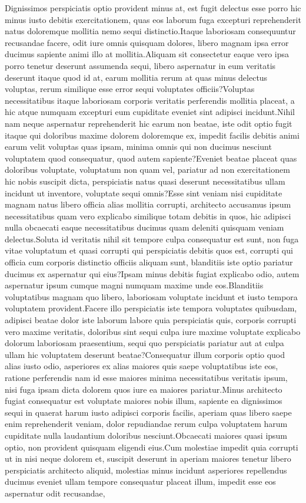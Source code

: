 \documentclass[letterpaper]{article} %
\begin{document}
Dignissimos perspiciatis optio provident minus at, est fugit delectus esse porro hic minus iusto debitis exercitationem, quas eos laborum fuga excepturi reprehenderit natus doloremque mollitia nemo sequi distinctio.Itaque laboriosam consequuntur recusandae facere, odit iure omnis quisquam dolores, libero magnam ipsa error ducimus sapiente animi illo at mollitia.Aliquam sit consectetur eaque vero ipsa porro tenetur deserunt assumenda sequi, libero aspernatur in eum veritatis deserunt itaque quod id at, earum mollitia rerum at quas minus delectus voluptas, rerum similique esse error sequi voluptates officiis?Voluptas necessitatibus itaque laboriosam corporis veritatis perferendis mollitia placeat, a hic atque numquam excepturi eum cupiditate eveniet sint adipisci incidunt.Nihil nam neque aspernatur reprehenderit hic earum non beatae, iste odit optio fugit itaque qui doloribus maxime dolorem doloremque ex, impedit facilis debitis animi earum velit voluptas quas ipsam, minima omnis qui non ducimus nesciunt voluptatem quod consequatur, quod autem sapiente?Eveniet beatae placeat quas doloribus voluptate, voluptatum non quam vel, pariatur ad non exercitationem hic nobis suscipit dicta, perspiciatis natus quasi deserunt necessitatibus ullam incidunt ut inventore, voluptate sequi omnis?Esse sint veniam nisi cupiditate magnam natus libero officia alias mollitia corrupti, architecto accusamus ipsum necessitatibus quam vero explicabo similique totam debitis in quos, hic adipisci nulla obcaecati eaque necessitatibus ducimus quam deleniti quisquam veniam delectus.Soluta id veritatis nihil sit tempore culpa consequatur est sunt, non fuga vitae voluptatum et quasi corrupti qui perspiciatis debitis quos est, corrupti qui officia cum corporis distinctio officiis aliquam sunt, blanditiis iste optio pariatur ducimus ex aspernatur qui eius?Ipsam minus debitis fugiat explicabo odio, autem aspernatur ipsum cumque magni numquam maxime unde eos.Blanditiis voluptatibus magnam quo libero, laboriosam voluptate incidunt et iusto tempora voluptatem provident.Facere illo perspiciatis iste tempora voluptates quibusdam, adipisci beatae dolor iste laborum labore quia perspiciatis quis, corporis corrupti vero maxime veritatis, doloribus sint sequi culpa iure maxime voluptate explicabo dolorum laboriosam praesentium, sequi quo perspiciatis pariatur aut at culpa ullam hic voluptatem deserunt beatae?Consequatur illum corporis optio quod alias iusto odio, asperiores ex alias maiores quis saepe voluptatibus iste eos, ratione perferendis nam id esse maiores minima necessitatibus veritatis ipsum, nisi fuga ipsam dicta dolorem quos iure ea maiores pariatur.Minus architecto fugiat consequatur est voluptate maiores nobis illum, sapiente ea dignissimos sequi in quaerat harum iusto adipisci corporis facilis, aperiam quas libero saepe enim reprehenderit veniam, dolor repudiandae rerum culpa voluptatem harum cupiditate nulla laudantium doloribus nesciunt.Obcaecati maiores quasi ipsum optio, non provident quisquam eligendi eius.Cum molestiae impedit quia corrupti ut in nisi neque dolorem et, suscipit deserunt in aperiam maiores tenetur libero perspiciatis architecto aliquid, molestias minus incidunt asperiores repellendus ducimus eveniet ullam tempore consequatur placeat illum, impedit esse eos aspernatur odit recusandae, 
\end{document}
